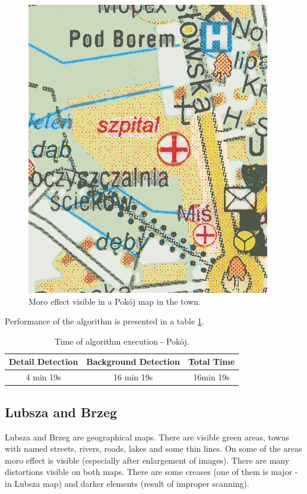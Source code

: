 \documentclass[a4paper,onecolumn,oneside,12pt]{memoir}
\begin{document}
\begin{figure}[!ht]
\begin{center}
\includegraphics[scale=0.4]{images/pokojBadCity.png}
\caption{Moro effect visible in a Pokój map in the town.}
\label{pokojBadCity}
\end{center}
\end{figure}

Performance of the algorithm is presented in a table \ref{pokojPerformance}.

\begin{table}[!ht]
\begin{center}
\caption{Time of algorithm execution - Pokój.}
\label{pokojPerformance}
\begin{tabular}{|c|c|c|}
  \hline
  Detail Detection & Background Detection & Total Time \\
  \hline
  4 min 19s & 16 min 19s & 16min 19s \\
  \hline
\end{tabular}
\end{center}
\end{table}

\subsection{Lubsza and Brzeg}

Lubsza and Brzeg are geographical maps. There are visible green areas, towns with named streets,
rivers, roads, lakes and some thin lines. On some of the areas moro effect is visible (especially
after enlargement of images). There are many distortions visible on both maps. There are some
creases (one of them is major - in Lubsza map) and darker elements (result of improper scanning).
\end{document}
